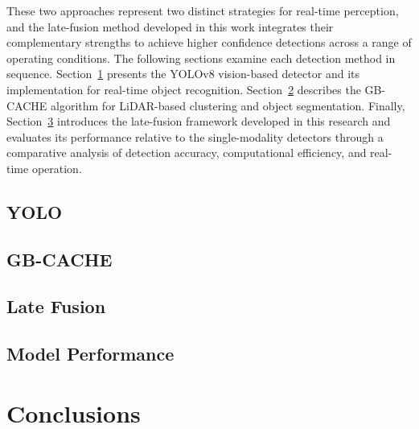 \documentclass{erauthesis}
\begin{document}
These two approaches represent two distinct strategies for real-time perception, and the late-fusion method developed in this work integrates their complementary strengths to achieve higher confidence detections across a range of operating conditions.
The following sections examine each detection method in sequence.
Section~\ref{yolo} presents the YOLOv8 vision-based detector and its implementation for real-time object recognition.
Section~\ref{gbcache} describes the GB-CACHE algorithm for LiDAR-based clustering and object segmentation.
Finally, Section~\ref{late_fusion} introduces the late-fusion framework developed in this research and evaluates its performance relative to the single-modality detectors through a comparative analysis of detection accuracy, computational efficiency, and real-time operation.


\section{YOLO} \label{yolo}


\section{GB-CACHE} \label{gbcache}


\section{Late Fusion} \label{late_fusion}


\section{Model Performance} \label{performance}


\chapter{Conclusions}


\end{document}
